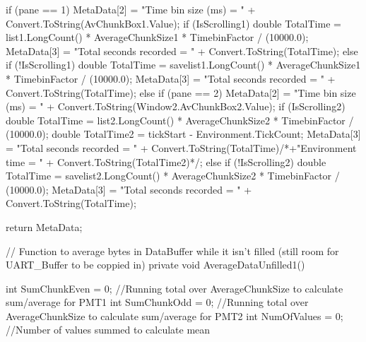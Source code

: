 {{{            if (pane == 1)
            {
                MetaData[2] = "Time bin size (ms) = " + Convert.ToString(AvChunkBox1.Value);
                if (IsScrolling1)
                {
                    double TotalTime = list1.LongCount() * AverageChunkSize1 * TimebinFactor / (10000.0);
                    MetaData[3] = "Total seconds recorded = " + Convert.ToString(TotalTime);
                }
                else if (!IsScrolling1)
                {
                    double TotalTime = savelist1.LongCount() * AverageChunkSize1 * TimebinFactor / (10000.0);
                    MetaData[3] = "Total seconds recorded = " + Convert.ToString(TotalTime);
                }
            }
            else if (pane == 2)
            {
                MetaData[2] = "Time bin size (ms) = " + Convert.ToString(Window2.AvChunkBox2.Value);
                if (IsScrolling2)
                {
                    double TotalTime = list2.LongCount() * AverageChunkSize2 * TimebinFactor / (10000.0);
                    double TotalTime2 = tickStart - Environment.TickCount;
                    MetaData[3] = "Total seconds recorded = " + Convert.ToString(TotalTime)/*+"Environment time = " + Convert.ToString(TotalTime2)*/;
                }
                else if (!IsScrolling2)
                {
                    double TotalTime = savelist2.LongCount() * AverageChunkSize2 * TimebinFactor / (10000.0);
                    MetaData[3] = "Total seconds recorded = " + Convert.ToString(TotalTime);
                }
            }

            return MetaData;

        }


        // Function to average bytes in DataBuffer while it isn't filled (still room for UART_Buffer to be coppied in)
        private void AverageDataUnfilled1()
        {
            int SumChunkEven = 0; //Running total over AverageChunkSize to calculate sum/average for PMT1
            int SumChunkOdd = 0; //Running total over AverageChunkSize to calculate sum/average for PMT2
            int NumOfValues = 0; //Number of values summed to calculate mean

}}}
